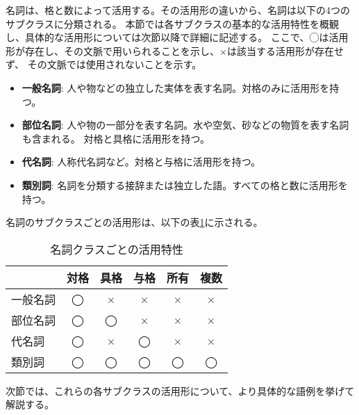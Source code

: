 名詞は、格と数によって活用する。その活用形の違いから、名詞は以下の4つのサブクラスに分類される。
本節では各サブクラスの基本的な活用特性を概観し、具体的な活用形については次節以降で詳細に記述する。
ここで、◯は活用形が存在し、その文脈で用いられることを示し、×は該当する活用形が存在せず、
その文脈では使用されないことを示す。

\begin{itemize}
    \item \textbf{一般名詞}: 人や物などの独立した実体を表す名詞。対格のみに活用形を持つ。
    \item \textbf{部位名詞}: 人や物の一部分を表す名詞。水や空気、砂などの物質を表す名詞も含まれる。
    対格と具格に活用形を持つ。
    \item \textbf{代名詞}: 人称代名詞など。対格と与格に活用形を持つ。
    \item \textbf{類別詞}: 名詞を分類する接辞または独立した語。すべての格と数に活用形を持つ。
\end{itemize}

名詞のサブクラスごとの活用形は、以下の表\ref{tab:noun_classes}に示される。

\begin{table}[H]
\centering
\begin{tabular}{|l||c|c|c|c|c|}
\hline
\textbf{} & \textbf{対格} & \textbf{具格} & \textbf{与格} & \textbf{所有} & \textbf{複数} \\
\hline
\hline
一般名詞 & ◯ & × & × & × & × \\
\hline
部位名詞 & ◯ & ◯ & × & × & × \\
\hline
代名詞 & ◯ & × & ◯ & × & × \\
\hline
類別詞 & ◯ & ◯ & ◯ & ◯ & ◯ \\
\hline
\end{tabular}
\caption{\centering 名詞クラスごとの活用特性}
\label{tab:noun_classes}
\end{table}

\vspace{1em}

次節では、これらの各サブクラスの活用形について、より具体的な語例を挙げて解説する。